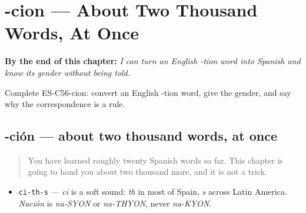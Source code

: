 
\chapter{-cion --- About Two Thousand Words, At Once}
\label{ch:friend-cion}

\begin{chapteropening}
\textbf{By the end of this chapter:} \emph{I can turn an English -tion word into Spanish and know its gender without being told.}

Complete ES-C56-cion: convert an English -tion word, give the gender, and say why the correspondence is a rule.
\end{chapteropening}

\section[-ción]{-ción — about two thousand words, at once}

\label{lesson:ES-C56-cion}



\begin{quote}
You have learned roughly twenty Spanish words so far. This chapter is going to hand you about two thousand more, and it is not a trick.
\end{quote}

\begin{sounds}
\begin{itemize}
\raggedright
  \item \texttt{ci-th-s} — \emph{ci} is a soft sound: \emph{th} in most of Spain, \emph{s} across Latin America. \emph{Nación} is \emph{na-SYON} or \emph{na-THYON}, never \emph{na-KYON}.
\end{itemize}
\end{sounds}

